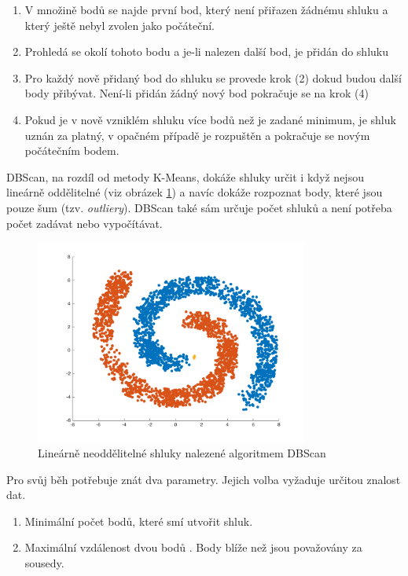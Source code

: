 \documentclass[pdftex,a4paper]{article}
\begin{document}
\begin{enumerate}
	\item V množině bodů se najde první bod, který není přiřazen žádnému shluku a který ještě nebyl zvolen jako počáteční.
	\item Prohledá se \textepsilon okolí tohoto bodu a je-li nalezen další bod, je přidán do shluku
	\item Pro každý nově přidaný bod do shluku se provede krok (2) dokud budou další body přibývat. Není-li přidán žádný nový bod pokračuje se na krok (4)
	\item Pokud je v nově vzniklém shluku více bodů než je zadané minimum, je shluk uznán za platný, v opačném případě je rozpuštěn a pokračuje se novým počátečním bodem.
\end{enumerate}

DBScan, na rozdíl od metody K-Means, dokáže shluky určit i když nejsou lineárně oddělitelné (viz obrázek \ref{fig:obr2}) a navíc dokáže rozpoznat body, které jsou pouze šum (tzv. \textit{outliery}). DBScan také sám určuje počet shluků a není potřeba počet zadávat nebo vypočítávat.

\begin{figure}[h]
	\centering
	\includegraphics[width=0.8\textwidth]{res/dbscan.png}
	\caption{Lineárně neoddělitelné shluky nalezené algoritmem DBScan}
	\label{fig:obr2}
\end{figure}

\vspace{\baselineskip}

Pro svůj běh potřebuje znát dva parametry. Jejich volba vyžaduje určitou znalost dat.

\begin{enumerate}
	\item Minimální počet bodů, které smí utvořit shluk.
	\item Maximální vzdálenost dvou bodů \textepsilon. Body blíže než \textepsilon{} jsou považovány za sousedy.
\end{enumerate}
\end{document}

